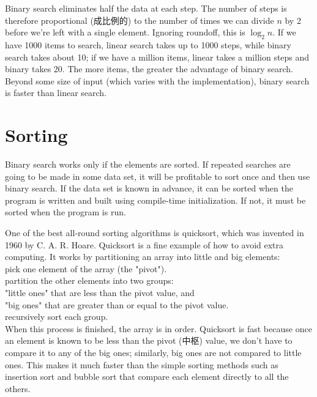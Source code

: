 Binary search eliminates half the data at each step. The number of steps is
therefore proportional (成比例的) to the number of times we can divide $n$
by 2 before we're left with a single element. Ignoring roundoff, this is
$\log_2 n$. If we have 1000 items to search, linear search takes up to 1000
steps, while binary search takes about 10; if we have a million items,
linear takes a million steps and binary takes 20. The more items, the
greater the advantage of binary search. Beyond some size of input (which
varies with the implementation), binary search is faster than linear
search.

\section{Sorting}
\label{sec:sorting}

Binary search works only if the elements are sorted. If repeated searches
are going to be made in some data set, it will be profitable to sort once
and then use binary search. If the data set is known in advance, it can be
sorted when the program is written and built using compile-time
initialization. If not, it must be sorted when the program is run.

One of the best all-round sorting algorithms is quicksort, which was
invented in 1960 by C. A. R. Hoare. Quicksort is a fine example of how to
avoid extra computing. It works by partitioning an array into little and
big elements:\\

\indent \indent pick one element of the array (the "pivot").  \\
\indent \indent partition the other elements into two groups: \\
\indent \indent \indent "little ones" that are less than the pivot value,
and   \\
\indent \indent \indent "big ones" that are greater than or equal to the
pivot value.    \\
\indent \indent recursively sort each group.\\

When this process is finished, the array is in order. Quicksort is fast
because once an element is known to be less than the pivot (中枢) value, we
don't have to compare it to any of the big ones; similarly, big ones are
not compared to little ones. This makes it much faster than the simple
sorting methods such as insertion sort and bubble sort that compare each
element directly to all the others.

